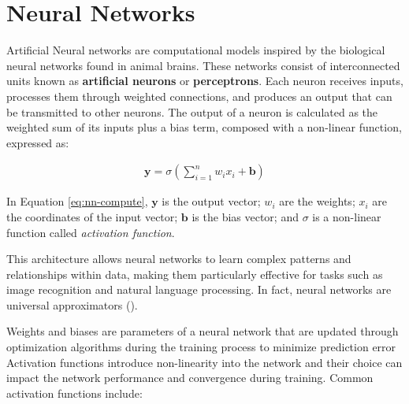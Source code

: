 

\section{Neural Networks}

Artificial Neural networks are computational models inspired by the biological neural networks found in animal brains. These networks consist of interconnected units known as \textbf{artificial neurons} or \textbf{perceptrons}. Each neuron receives inputs, processes them through weighted connections, and produces an output that can be transmitted to other neurons. The output of a neuron is calculated as the weighted sum of its inputs plus a bias term, composed with a non-linear function, expressed as:

\begin{align}
  \mathbf{y} = \sigma\left(\sum_{i=1}^{n} w_i x_i + \mathbf{b}\right)
  \label{eq:nn-compute}
\end{align}

In Equation \ref{eq:nn-compute}, \(\mathbf{y}\) is the output vector; \(w_i\) are the weights; \(x_i\) are the coordinates of the input vector; \(\mathbf{b}\) is the bias vector; and \(\sigma\) is a non-linear function called \textit{activation function}.


This architecture allows neural networks to learn complex patterns and relationships within data, making them particularly effective for tasks such as image recognition and natural language processing. In fact, neural networks are universal approximators (\cite{HORNIK1989359,cybenko89}).

Weights and biases are parameters of a neural network that are updated through optimization algorithms during the training process to minimize prediction error Activation functions introduce non-linearity into the network and their choice can impact the network performance and convergence during training. Common activation functions include:

